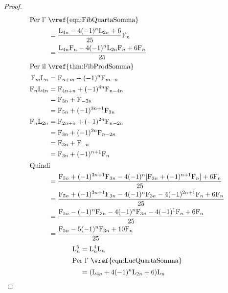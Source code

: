 \begin{proof}
\begin{align*}
		\intertext{Per l'~\vref{eqn:FibQuartaSomma}}
		={}                & \dfrac{\Luc{4n}-4(-1)^n\Luc{2n}+6}{25}\Fib{n}                                         \\
		={}                & \dfrac{\Luc{4n}\Fib{n}-4(-1)^n\Luc{2n}\Fib{n}+6\Fib{n}}{25}                           \\
		\intertext{Per il~\vref{thm:FibProdSomma}}
		\Fib{m}\Luc{n}={}  & \Fib{n+m}+(-1)^n\Fib{m-n}                                                             \\
		\Fib{n}\Luc{4n}={} & \Fib{4n+n}+(-1)^{4n}\Fib{n-4n}                                                        \\
		={}                & \Fib{5n}+\Fib{-3n}                                                                    \\
		={}                & \Fib{5n}+(-1)^{3n+1}\Fib{3n}                                                          \\
		\Fib{n}\Luc{2n}={} & \Fib{2n+n}+(-1)^{2n}\Fib{n-2n}                                                        \\
		={}                & \Fib{3n}+(-1)^{2n}\Fib{n-2n}                                                          \\
		={}                & \Fib{3n}+\Fib{-n}                                                                     \\
		={}                & \Fib{3n}+(-1)^{n+1}\Fib{n}                                                            \\
		\intertext{Quindi}
		={}                & \dfrac{\Fib{5n}+(-1)^{3n+1}\Fib{3n}-4(-1)^n[\Fib{3n}+(-1)^{n+1}\Fib{n}]+6\Fib{n}}{25} \\
		={}                & \dfrac{\Fib{5n}+(-1)^{3n+1}\Fib{3n}-4(-1)^n\Fib{3n}-4(-1)^{2n+1}\Fib{n}+6\Fib{n}}{25} \\
		={}                & \dfrac{\Fib{5n}-(-1)^{n}\Fib{3n}-4(-1)^n\Fib{3n}-4(-1)^{1}\Fib{n}+6\Fib{n}}{25}       \\
		={}                & \dfrac{\Fib{5n}-5(-1)^n\Fib{3n}+10\Fib{n}}{25}                                        \\
	\end{align*}
	\begin{align*}
		\Luc{n}^5={}       & \Luc{n}^4\Luc{n}                                                     \\
		\intertext{Per l'~\vref{eqn:LucQuartaSomma}}
		={}                & (\Luc{4n}+4(-1)^n\Luc{2n}+6)\Luc{n}                                  \\

\end{align*}
\end{proof}
